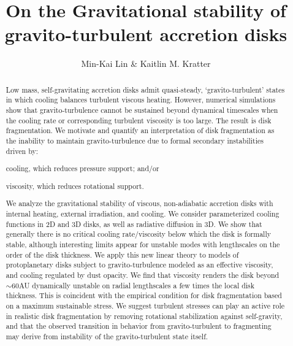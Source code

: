 \documentclass[iop, numberedappendix]{emulateapj}
\begin{document}
\title{On the Gravitational stability of gravito-turbulent accretion disks}
\author{Min-Kai Lin \& Kaitlin M. Kratter}

\begin{abstract}
  Low mass, self-gravitating accretion disks admit quasi-steady,
  `gravito-turbulent' states in which cooling balances turbulent viscous 
  heating. However, numerical simulations show that gravito-turbulence
  cannot be sustained beyond dynamical timescales when the cooling
  rate or corresponding turbulent viscosity is too large. The result is disk fragmentation.         
  We motivate and quantify an interpretation of disk 
  fragmentation as the inability to maintain gravito-turbulence due to  
  formal secondary instabilities driven by:  
\begin{inparaenum}[1)] 
\item 
  cooling, which reduces pressure support; and/or
\item 
  viscosity, which reduces rotational support. 
\end{inparaenum}
We analyze the gravitational stability of viscous, non-adiabatic
accretion disks with internal heating, external irradiation, and cooling.  
We consider parameterized cooling functions in 2D and 3D disks, %
as well as 
radiative diffusion in 3D. We show that 
generally there is no critical cooling rate/viscosity below which 
the disk is formally stable, although interesting limits appear 
for unstable modes with lengthscales on the order of the disk thickness.   
We apply this new linear theory to 
models of protoplanetary disks subject to
gravito-turbulence modeled as an effective 
viscosity, and cooling regulated by dust opacity. 
We find that viscosity renders the disk beyond $\sim 60$AU dynamically
unstable on radial %
lengthscales a few times the local disk thickness. This is coincident 
with the empirical condition for disk fragmentation based on a
maximum sustainable stress. 
We suggest turbulent stresses can play an active role in realistic disk 
fragmentation by removing rotational stabilization against 
self-gravity, and that the observed transition in behavior from 
gravito-turbulent to fragmenting may derive from  
instability of the gravito-turbulent state itself.
\end{abstract}
\end{document}
